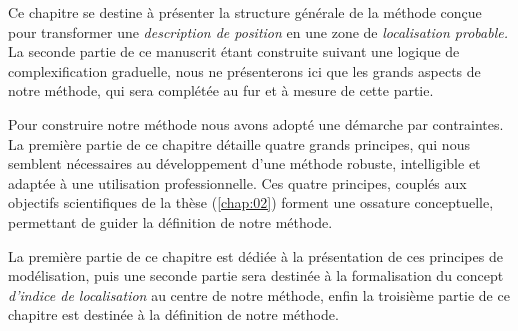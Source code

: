 Ce chapitre se destine à présenter la structure générale de la méthode
conçue pour transformer une \emph{description de position} en une zone
de \emph{localisation probable.} La seconde partie de ce manuscrit
étant construite suivant une logique de complexification graduelle,
nous ne présenterons ici que les grands aspects de notre méthode, qui
sera complétée au fur et à mesure de cette partie.

Pour construire notre méthode nous avons adopté une démarche par
contraintes. La première partie de ce chapitre détaille quatre grands
principes, qui nous semblent nécessaires au développement d'une
méthode robuste, intelligible et adaptée à une utilisation
professionnelle. Ces quatre principes, couplés aux objectifs
scientifiques de la thèse (\autoref{chap:02}) forment une ossature
conceptuelle, permettant de guider la définition de notre méthode.

La première partie de ce chapitre est dédiée à la présentation de ces
principes de modélisation, puis une seconde partie sera destinée à la
formalisation du concept \emph{d'indice de localisation} au centre de
notre méthode, enfin la troisième partie de ce chapitre est destinée à
la définition de notre méthode.
